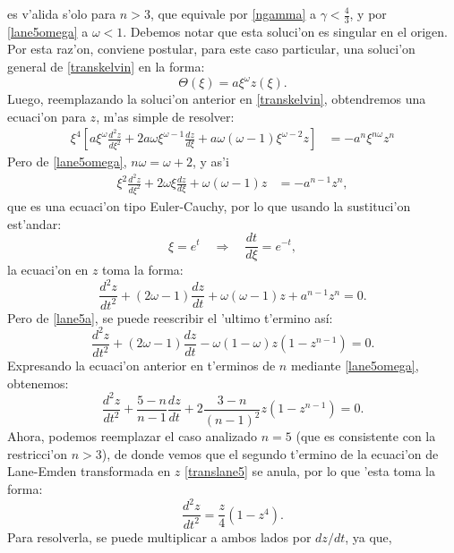 es v'alida s'olo para $n>3$, que equivale por \eqref{ngamma} a $\gamma<\frac{4}{3}$, y por \eqref{lane5omega} a $\omega<1$. Debemos notar que esta soluci'on es singular en el origen. Por esta raz'on, conviene postular, para este caso particular, una soluci'on general de \eqref{transkelvin} en la forma:
\begin{equation}\label{lane5solgeneral}
 \Theta(\xi)=a\xi^{\omega}z(\xi).
\end{equation}
Luego, reemplazando la soluci'on anterior en \eqref{transkelvin}, obtendremos una ecuaci'on  para $z$, m'as simple de resolver:
\begin{align}
 \xi^4\left[a\xi^{\omega}\frac{d^2 z}{d\xi^2}+2a\omega\xi^{\omega-1}\frac{dz}{d\xi}+a\omega(\omega-1)\xi^{\omega-2}z\right]&=-a^{n}\xi^{n\omega}z^n
 \end{align}
Pero de \eqref{lane5omega}, $n\omega=\omega+2$, y as'i
\begin{align}
\xi^2\frac{d^2 z}{d\xi^2}+2\omega\xi\frac{dz}{d\xi}+\omega(\omega-1)z&=-a^{n-1}z^n,
\end{align}
que es una ecuaci'on tipo Euler-Cauchy, por lo que usando la sustituci'on est'andar:
\begin{equation}\label{euler-sust}
 \xi=e^{t}\quad\Rightarrow\quad \frac{dt}{d\xi}=e^{-t},
\end{equation}
la ecuaci'on en $z$ toma la forma:
\begin{equation}
 \frac{d^2 z}{dt^2}+(2\omega-1)\frac{dz}{dt}+\omega(\omega-1)z+a^{n-1}z^n=0.
\end{equation}
Pero de \eqref{lane5a}, se puede reescribir el 'ultimo t'ermino as\'i:
\begin{equation}
 \frac{d^2 z}{dt^2}+(2\omega-1)\frac{dz}{dt}-\omega(1-\omega)z(1-z^{n-1})=0.
\end{equation}
Expresando la ecuaci'on anterior en t'erminos de $n$ mediante \eqref{lane5omega}, obtenemos:
\begin{equation}\label{translane5}
 \frac{d^2 z}{dt^2}+\frac{5-n}{n-1}\frac{dz}{dt}+2\frac{3-n}{(n-1)^2}z(1-z^{n-1})=0.
\end{equation}
Ahora, podemos reemplazar el caso analizado $n=5$ (que es consistente con la restricci'on $n>3$), de donde vemos que el segundo t'ermino de la ecuaci'on de Lane-Emden transformada en $z$ \eqref{translane5} se anula, por lo que 'esta toma la forma:
\begin{equation}\label{translane5b}
 \frac{d^2 z}{dt^2}=\frac{z}{4}(1-z^4).
\end{equation}
Para resolverla, se puede multiplicar a ambos lados por $dz/dt$, ya que,
